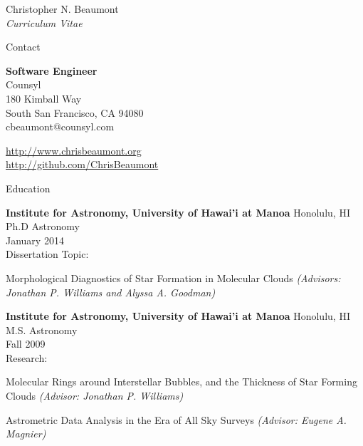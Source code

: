 \documentclass[10pt]{article}
\newenvironment{sublist}{%
	\begin{list}{}{%
		\setlength{\itemsep}{0em}\setlength{\parsep}{0em}%
		\setlength{\topsep}{0em}\setlength{\parskip}{0em}%
	}%
}%
{ \end{list} }
\begin{document}
\date{}


\newlength{\oldcvlabelwidth}
\renewcommand*{\cvbibname}{}

\begin{cv}{Christopher N. Beaumont\\{\large \itshape Curriculum Vitae}}

\begin{cvlist}{Contact}
	\item
	\textbf{Software Engineer} \\
	Counsyl \\
	180 Kimball Way \\
	South San Francisco, CA 94080\\
	cbeaumont@counsyl.com

	\item \href{http://www.chrisbeaumont.org}{http://www.chrisbeaumont.org} \\  
	\href{http://github.com/ChrisBeaumont}{http://github.com/ChrisBeaumont}
	
\end{cvlist}

\begin{cvlist}{Education}
	\item \textbf{Institute for Astronomy, University of Hawai'i at Manoa} Honolulu, HI \\
		Ph.D Astronomy \\
		January 2014 \\
		Dissertation Topic: 
		\begin{sublist}
		\item Morphological Diagnostics of Star Formation in Molecular Clouds \emph{(Advisors: Jonathan P. Williams and Alyssa A. Goodman)}
		\end{sublist}
	\item \textbf{Institute for Astronomy, University of Hawai'i at Manoa} Honolulu, HI\\
		M.S. Astronomy\\
		Fall 2009\\
		Research:
		\begin{sublist}
		\item Molecular Rings around Interstellar Bubbles, and the Thickness of Star Forming Clouds \emph{(Advisor: Jonathan P. Williams)}
		\item Astrometric Data Analysis in the Era of All Sky Surveys \emph{(Advisor: Eugene A. Magnier)}
		\end{sublist}
		

\end{cvlist}
\end{cv}
\end{document}
